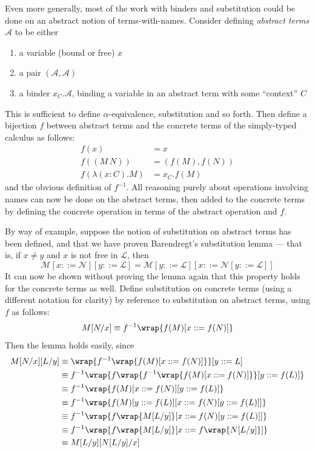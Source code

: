 Even more generally, most of the work with binders and substitution could be done on an abstract notion of terms-with-names.
Consider defining \emph{abstract terms} \(\mathcal A\) to be either
\begin{enumerate}
\item a variable (bound or free) \(x\)
\item a pair \((\mathcal A, \mathcal A)\)
\item a binder \(x_C.\mathcal A\), binding a variable in an abstract term with some ``context'' \(C\)
\end{enumerate}
This is sufficient to define \(\alpha\)-equivalence, substitution and so forth.
Then define a bijection \(f\) between abstract terms and the concrete terms of the simply-typed calculus as follows:
\begin{align*}
f(x) &= x\\
f((M\ N)) &= (f(M), f(N))\\
f(\lambda (x : C). M) &= x_C.f(M)
\end{align*}
and the obvious definition of \(f^{-1}\).
All reasoning purely about operations involving names can now be done on the abstract terms, then added to the concrete terms by defining the concrete operation in terms of the abstract operation and \(f\).

By way of example, suppose the notion of substitution on abstract terms has been defined, and that we have proven Barendregt's substitution lemma --- that is, if \(x \neq y\) and \(x\) is not free in \(\mathcal L\), then
\[
\mathcal M[x ::= \mathcal N][y ::= \mathcal L] = \mathcal M[y ::= \mathcal L][x ::= \mathcal N[y ::= \mathcal L]]
\]
It can now be shown without proving the lemma again that this property holds for the concrete terms as well.
Define substitution on concrete terms (using a different notation for clarity) by reference to substitution on abstract terms, using \(f\) as follows:
\[
M[N/x] \equiv f^{-1}\wrap{f(M)[x ::= f(N)]}
\]
Then the lemma holds easily, since
\begin{align*}
M[N/x][L/y]
	&\equiv \wrap{f^{-1}\wrap{f(M)[x ::= f(N)]}}[y ::= L]\\
	&\equiv f^{-1}\wrap{f\wrap{f^{-1}\wrap{f(M)[x ::= f(N)]}}[y ::= f(L)]}\\
	&\equiv f^{-1}\wrap{f(M)[x ::= f(N)][y ::= f(L)]}\\
	&\equiv f^{-1}\wrap{f(M)[y ::= f(L)][x ::= f(N)[y ::= f(L)]]}\\
	&\equiv f^{-1}\wrap{f\wrap{M[L/y]}[x ::= f(N)[y ::= f(L)]]}\\
	&\equiv f^{-1}\wrap{f\wrap{M[L/y]}[x ::= f\wrap{N[L/y]}]}\\
	&\equiv M[L/y][N[L/y]/x]
\end{align*}

